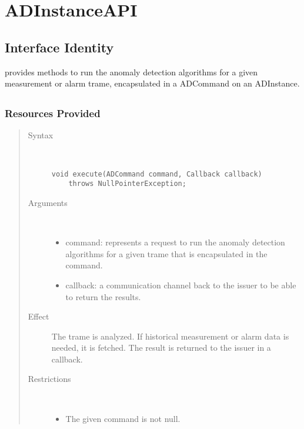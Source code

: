 \section{ADInstanceAPI}
\label{api:ad-instance-api}

\subsection{Interface Identity}

\npar {} provides methods to run the anomaly detection
algorithms for a given measurement or alarm trame, encapsulated in a ADCommand
on an ADInstance.

\subsection{}

\subsubsection{Resources Provided}

\begin{quote}
	\begin{description}
		\item[Syntax] \ 
		\begin{verbatim}
void execute(ADCommand command, Callback callback) 
    throws NullPointerException;
		\end{verbatim}
		\item[Arguments] \
		\begin{itemize}
			\item command: represents a request to run the anomaly detection algorithms
			for a given trame that is encapsulated in the command.
			\item callback: a communication channel back to the issuer to be able to
			return the results.
		\end{itemize}
		\item[Effect] The trame is analyzed. If historical measurement or alarm data
		is needed, it is fetched. The result is returned to the issuer in a callback.
		\item[Restrictions] \ 
		\begin{itemize}
			\item The given command is not null.
		\end{itemize}
	\end{description} 
\end{quote}

